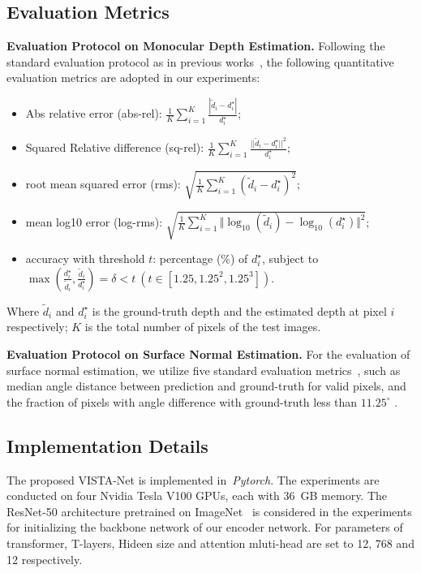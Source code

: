 \subsection{Evaluation Metrics}
\par\noindent\textbf{Evaluation Protocol on Monocular Depth Estimation.}
Following the standard evaluation protocol as in previous works~\cite{eigen2015predicting,eigen2014depth,wang2015towards}, the following quantitative evaluation metrics are adopted in our experiments: 
\begin{itemize}
\item Abs relative error (abs-rel): 
\( \frac{1}{K}\sum_{i=1}^K\frac{|\tilde{d}_i - d_i^\star|}{d_i^\star} \); 
\item Squared Relative difference (sq-rel):
\( \frac{1}{K}\sum_{i=1}^K\frac{||\tilde{d}_i - d_i^\star||^2}{d_i^\star} \); 
\item root mean squared error (rms): 
\( \sqrt{\frac{1}{K}\sum_{i=1}^K(\tilde{d}_i - d_i^\star)^2} \);
\item mean log10 error (log-rms): 
\( \sqrt{\frac{1}{K}\sum_{i=1}^K \Vert \log_{10}(\tilde{d}_i) - \log_{10}(d_i^\star) \Vert^2 }\);
\item accuracy with threshold $t$: percentage (\%) of $d_i^\star$, subject to $\max (\frac{d_i^\star}{\tilde{d}_i}, \frac{\tilde{d}_i}{d_i^\star}) = 
\delta < t~(t \in [1.25, 1.25^2, 1.25^3])$.
\end{itemize}
Where $\tilde{d}_i$ and $d_i^\star$ is the ground-truth depth and the estimated depth at pixel $i$ respectively; $K$ is the total number of pixels of the test images.

\par\noindent\textbf{Evaluation Protocol on Surface Normal Estimation.} For the evaluation of surface normal estimation, we utilize five standard evaluation metrics~\cite{fouhey2013data},  such as median angle distance between prediction and ground-truth for valid pixels, and the fraction of pixels with angle difference with ground-truth less than $11.25^{\circ}$ . 

\subsection{Implementation Details} 
The proposed VISTA-Net is implemented in~\textit{Pytorch}. The experiments are conducted on four Nvidia Tesla V100 GPUs, each with 36~GB memory. The ResNet-50 architecture pretrained on ImageNet~\cite{deng2009imagenet} is considered in the experiments for initializing the backbone network of our encoder network. For parameters of transformer, T-layers, Hideen size and attention mluti-head are set to 12, 768 and 12 respectively.

